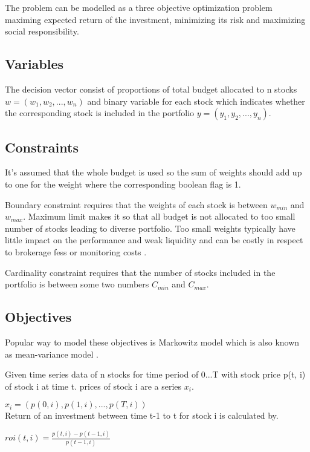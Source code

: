 \documentclass[11pt]{article} %
\begin{document}
The problem can be modelled as a three objective optimization problem maximing expected return of the investment, minimizing its risk and maximizing social responsibility.

\subsection{Variables}

The decision vector consist of proportions of total budget allocated to n stocks $w = (w_1, w_2, ..., w_n)$ and binary variable for each stock which indicates whether the corresponding stock is included in the portfolio $y=(y_1, y_2,..., y_n)$. 

\subsection{Constraints}

It's assumed that the whole budget is used so the sum of weights should add up to one for the weight where the corresponding boolean flag is 1.

Boundary constraint requires that the weights of each stock is between $w_{min}$ and $w_{max}$. Maximum limit makes it so that all budget is not allocated to too small number of stocks leading to diverse portfolio. Too small weights typically have little impact on the performance and weak liquidity and can be costly in respect to brokerage fess or monitoring costs \cite{ertenlice2018survey}.

Cardinality constraint requires that the number of stocks included in the portfolio is between some two numbers $C_{min}$ and $C_{max}$. 

\subsection{Objectives}

Popular way to model these objectives is Markowitz model which is also known as mean-variance model \cite{kolm201460}.

Given time series data of n stocks for time period of 0...T with stock price p(t, i) of stock i at time t. prices of stock i are a series $x_i$.

$x_i = (p(0, i), p(1, i), ..., p(T, i))$\\

Return of an investment between time t-1 to t for stock i is calculated by.

$roi(t,i) = \frac{p(t,i) - p(t-1,i)}{p(t-1,i)}$
\end{document}
